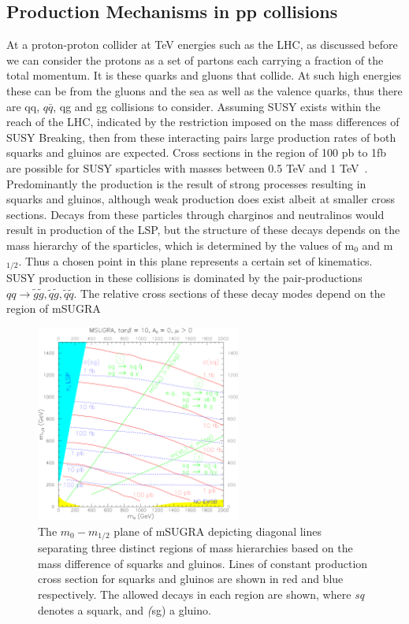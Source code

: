 \subsection{Production Mechanisms in pp collisions}
At a proton-proton collider at TeV energies such as the LHC, as discussed before we can consider the protons as a set of partons each carrying a fraction of the total momentum. It is these quarks and gluons that collide. At such high energies these can be from the gluons and the sea as well as the valence quarks, thus there are qq, $q\bar{q}$, qg and gg collisions to consider.
Assuming SUSY exists within the reach of the LHC, indicated by the restriction imposed on the mass differences of SUSY Breaking, then from these interacting pairs large production rates of both squarks and gluinos are expected. Cross sections in the region of 100 pb to 1fb are possible for SUSY sparticles with masses between 0.5 TeV and 1 TeV~\cite{early}. Predominantly the production is the result of strong processes resulting in squarks and gluinos, although weak production does exist albeit at smaller cross sections. Decays from these particles through charginos and neutralinos would result in production of the LSP, but the structure of these decays depends on the mass hierarchy of the sparticles, which is determined by the values of m$_{0}$ and m$_{1/2}$.  Thus a chosen point in this plane represents a certain set of kinematics. SUSY production in these collisions is dominated by the pair-productions $ qq \rightarrow \tilde{g} \tilde{g}, \tilde{q}\tilde{g}, \tilde{q} \tilde{q}$. The relative cross sections of these decay modes depend on the region of mSUGRA 

\begin{figure}
\centering
\includegraphics[width=0.6\textwidth]{Figures/Theory/mSUGRA_TDR_1}
\caption{\label{fig:msugratdr}The $m_{0}-m_{1/2}$ plane of mSUGRA depicting diagonal lines separating three distinct regions of mass hierarchies based on the mass difference of squarks and gluinos. Lines of constant production cross section for squarks and gluinos are shown in red and blue respectively. The allowed decays in each region are shown, where \textit{sq} denotes a squark, and \textit(sg) a gluino.\cite{CMSTDRII}}

\end{figure}

